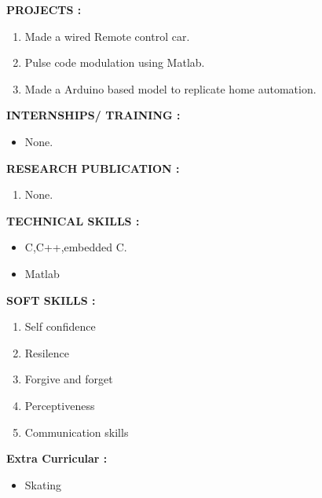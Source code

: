 \documentclass{article}
\begin{document}
	\textbf{PROJECTS :}
	\begin{enumerate}
		\item Made a wired Remote control car.
		\item Pulse code modulation using Matlab.
		\item Made a Arduino based model to replicate home automation.
	\end{enumerate}

	\textbf{INTERNSHIPS/ TRAINING :}
	\begin{itemize}
		\item None.
	\end{itemize}
	
		\textbf{RESEARCH PUBLICATION :}
		\begin{enumerate}
			\item None.
		\end{enumerate}
		
		\newpage
		
			\textbf{TECHNICAL SKILLS :}
			\begin{itemize}	
				\item C,C++,embedded C.
				\item Matlab 
				\end{itemize}
	
	
	\textbf{SOFT SKILLS :}
	\begin{enumerate}
	\item Self confidence 
	\item Resilence
	\item Forgive and forget
	\item Perceptiveness
	\item Communication skills 

	\end{enumerate}
	
	\textbf{Extra Curricular :}
	\begin{itemize}
		\item Skating
	\end{itemize}
	
\end{document}
